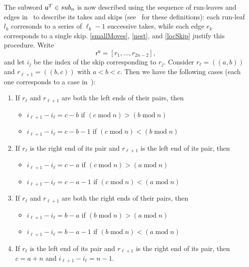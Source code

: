 \documentclass[a4paper,10pt,leqno]{amsart}
\numberwithin{equation}{section}
\theoremstyle{definition}
\theoremstyle{remark}
\renewcommand{\u}{\mathsf{u}}
\renewcommand{\S}{\textsc{sub}}
\renewcommand{\mod}{\;\mathrm{mod}\;}
\newcommand{\rr}{\mathsf{r}}
\newcommand{\rru}{\rr^\u}
\begin{document}
The subword $\u^T \in \S_n$ is now described using the sequence of run-leaves and edges in~ to describe its takes and skips (see~ for these definitions): each run-leaf $l_k$ corresonds to a series of $\ell_k-1$ successive takes, while each edge $e_k$ corresponds to a single skip.  \cref{smallMoves}, \cref{nest}, and \cref{locSkip} justify this procedure.    Write \[\rru = \left[r_1,\dots,r_{2n-2}\right],\] and let $i_j$ be the index of the skip corresponding to $r_j$.  Consider $r_\ell = (\!(a,b)\!)$ and $r_{\ell+1} = (\!(b,c)\!)$ with $a < b < c$.  Then we have the following cases (each one corresponds to a case in~):
    \begin{enumerate}[label=(\alph*)]
        \item If $r_\ell$ and $r_{\ell + 1}$ are both the left ends of their pairs, then 
        \begin{itemize}
            \item $i_{\ell + 1} - i_\ell = c - b$ if $(c \mod n) > (b \mod n)$
            \item $i_{\ell + 1} - i_\ell = c - b - 1$ if $(c \mod n) < (b \mod n)$
        \end{itemize}

        \item If $r_\ell$ is the right end of its pair and $r_{\ell + 1}$ is the left end of its pair, then 
        \begin{itemize}
            \item $i_{\ell + 1} - i_\ell = c - a$ if $(c \mod n) > (a \mod n)$
            \item $i_{\ell + 1} - i_\ell = c - a - 1$ if $(c \mod n) < (a \mod n)$
        \end{itemize}

        \item If $r_\ell$ and $r_{\ell + 1}$ are both the right ends of their pairs, then
        \begin{itemize}
            \item $i_{\ell + 1} - i_\ell = b - a$ if $(b \mod n) > (a \mod n)$
            \item $i_{\ell + 1} - i_\ell = b - a - 1$ if $(b \mod n) < (a \mod n)$
        \end{itemize}

        \item If $r_\ell$ is the left end of its pair and $r_{\ell + 1}$ is the right end of its pair, then $c = a+n$ and $i_{\ell + 1} - i_\ell = n-1$.
    \end{enumerate}
\end{document}
